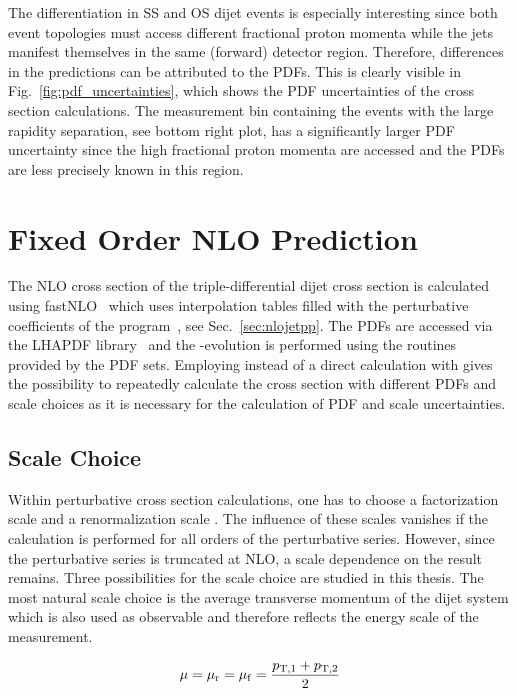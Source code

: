 The differentiation in SS and OS dijet events is especially interesting since
both event topologies must access different fractional proton momenta while the
jets manifest themselves in the same (forward) detector region. Therefore,
differences in the predictions can be attributed to the PDFs. This is clearly
visible in Fig.~\ref{fig:pdf_uncertainties}, which shows the PDF uncertainties of
the cross section calculations. The measurement bin containing the events with
the large rapidity separation, see bottom right plot, has a significantly larger
PDF uncertainty since the high fractional proton momenta are accessed and the
PDFs are less precisely known in this region.

\section{Fixed Order NLO Prediction}

The NLO cross section of the triple-differential dijet cross section is
calculated using fastNLO~\cite{Kluge:2006xs,Britzger:2012bs} which uses
interpolation tables filled with the perturbative coefficients of the \NLOJETPP
program~\cite{Nagy:2003tz}, see Sec.~\ref{sec:nlojetpp}. The PDFs are accessed
via the LHAPDF library~\cite{Whalley:2005nh,Buckley:2014ana} and the
\as-evolution is performed using the routines provided by the PDF sets.
Employing \fastNLO instead of a direct calculation with \NLOJETPP gives the
possibility to repeatedly calculate the cross section with  different PDFs and
scale choices as it is necessary for the calculation of PDF and scale
uncertainties.

\subsection{Scale Choice}
\label{sec:scale_coice}

Within perturbative cross section calculations, one has to choose a
factorization scale \muf and a renormalization scale \mur. The influence of
these scales vanishes if the calculation is performed for all orders of the
perturbative series. However, since the perturbative series is truncated at
NLO, a scale dependence on the result remains. Three possibilities for the scale
choice are studied in this thesis.  The most natural scale choice is the average
transverse momentum  of the dijet system which is also used as observable and
therefore reflects the energy scale of the measurement.

\begin{equation*}
    \mu = \mu_{\mathrm{r}} = \mu_{\mathrm{f}} = \frac{p_{\mathrm{T},1} + p_{\mathrm{T},2}}{2}
\end{equation*}

